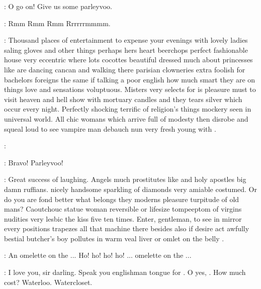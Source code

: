\Zoe:
O go on!
Give us some parleyvoo.


\Lynch:
Rmm Rmm Rmm Rrrrrrmmmm.

\Stephen:
Thousand places of entertainment to expense your evenings
with lovely ladies saling gloves and other things
perhaps hers heart beerchops perfect fashionable house
very eccentric where lots cocottes beautiful dressed much about princesses
like are dancing cancan and walking there parisian clowneries
extra foolish for bachelors foreigns the same if talking a poor english
how much smart they are on things love and sensations voluptuous.
Misters very selects for is pleasure must to visit heaven and hell show
with mortuary candles and they tears silver which occur every night.
Perfectly shocking terrific of religion's things mockery seen in universal world.
All chic womans which arrive full of modesty then disrobe and squeal loud
to see vampire man debauch nun very fresh young with .

\Lynch:

\Whores:
Bravo!
Parleyvoo!

\Stephen:
Great success of laughing.
Angels much prostitutes like and holy apostles big damn ruffians.
 nicely handsome sparkling of diamonds very amiable costumed.
Or do you are fond better what belongs they
moderns pleasure turpitude of old mans?
Caoutchouc statue woman reversible or lifesize tompeeptom of virgins nudities
very lesbic the kiss five ten times.
Enter, gentleman, to see in mirror every positions trapezes
all that machine there besides also if desire act
awfully bestial butcher's boy pollutes in warm veal liver
or omlet on the belly .

\Bella:
An omelette on the ...
Ho! ho! ho! ho! ...
omelette on the ...

\Stephen:
I love you, sir darling.
Speak you englishman tongue for .
O yes, .
How much cost?
Waterloo.
Watercloset.

